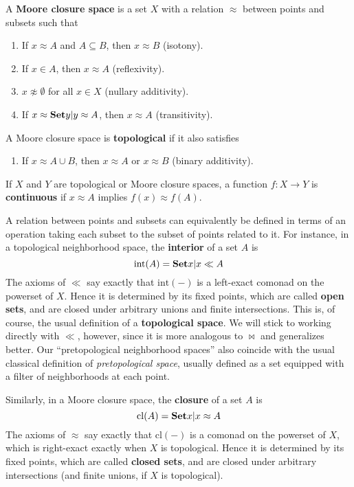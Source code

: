 \documentclass{article}
\def\napprox{\not\approx}
\def\int{\mathrm{int}}
\def\cl{\mathrm{cl}}
\begin{document}
\begin{defn}
  A \textbf{Moore closure space} is a set $X$ with a relation $\approx$ between points and subsets such that
  \begin{enumerate}
  \item If $x\approx A$ and $A\subseteq B$, then $x\approx B$ (isotony).
  \item If $x\in A$, then $x\approx A$ (reflexivity).
  \item $x\napprox \emptyset$ for all $x\in X$ (nullary additivity).
  \item If $x\approx \setof{ y | y\approx A}$, then $x\approx A$ (transitivity).
  \end{enumerate}
  A Moore closure space is \textbf{topological} if it also satisfies
  \begin{enumerate}[resume]
  \item If $x\approx A\cup B$, then $x\approx A$ or $x\approx B$ (binary additivity).
  \end{enumerate}
  If $X$ and $Y$ are topological or Moore closure spaces, a function $f:X\to Y$ is \textbf{continuous} if $x\approx A$ implies $f(x) \approx f(A)$.
\end{defn}

A relation between points and subsets can equivalently be defined in terms of an operation taking each subset to the subset of points related to it.
For instance, in a topological neighborhood space, the \textbf{interior} of a set $A$ is
\[ \int(A) = \setof{ x | x\ll A } \]
The axioms of $\ll$ say exactly that $\int(-)$ is a left-exact comonad on the powerset of $X$.
Hence it is determined by its fixed points, which are called \textbf{open sets}, and are closed under arbitrary unions and finite intersections.
This is, of course, the usual definition of a \textbf{topological space}.
We will stick to working directly with $\ll$, however, since it is more analogous to $\bowtie$ and generalizes better.
Our ``pretopological neighborhood spaces'' also coincide with the usual classical definition of \emph{pretopological space}, usually defined as a set equipped with a filter of neighborhoods at each point.

Similarly, in a Moore closure space, the \textbf{closure} of a set $A$ is
\[ \cl(A) = \setof{x | x \approx A } \]
The axioms of $\approx$ say exactly that $\cl(-)$ is a comonad on the powerset of $X$, which is right-exact exactly when $X$ is topological.
Hence it is determined by its fixed points, which are called \textbf{closed sets}, and are closed under arbitrary intersections (and finite unions, if $X$ is topological).
\end{document}
